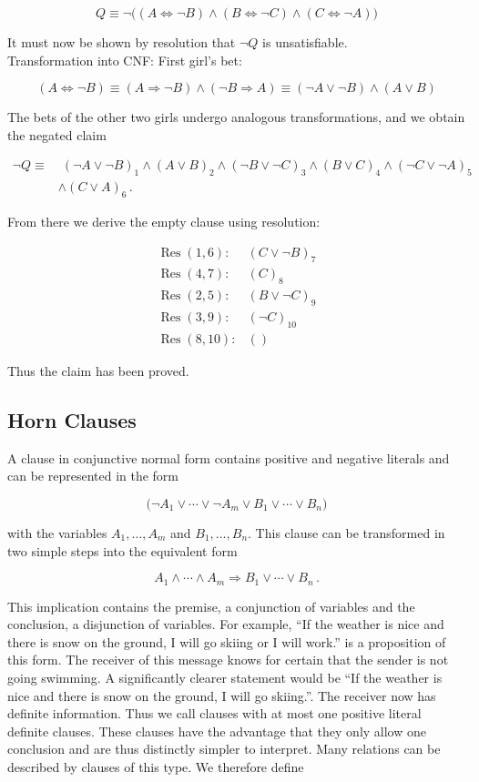 \documentclass[10pt]{book}
\begin{document}
$$
Q \equiv \neg\big((A \Leftrightarrow \neg B) \wedge (B \Leftrightarrow \neg C) \wedge (C \Leftrightarrow \neg A)\big)
$$

It must now be shown by resolution that $\neg Q$ is unsatisfiable.\\
Transformation into CNF: First girl's bet:

$$
(A \Leftrightarrow \neg B) \equiv (A \Rightarrow \neg B) \wedge (\neg B \Rightarrow A) \equiv (\neg A \vee \neg B) \wedge (A \vee B)
$$

The bets of the other two girls undergo analogous transformations, and we obtain the negated claim

$$
\begin{aligned}
\neg Q \equiv & \;(\neg A \vee \neg B)_{1} \wedge (A \vee B)_{2} \wedge (\neg B \vee \neg C)_{3} \wedge (B \vee C)_{4} \wedge (\neg C \vee \neg A)_{5} \\
& \wedge (C \vee A)_{6}\, .
\end{aligned}
$$

From there we derive the empty clause using resolution:

$$
\begin{array}{ll}
\operatorname{Res}(1,6): & (C \vee \neg B)_{7} \\
\operatorname{Res}(4,7): & (C)_{8} \\
\operatorname{Res}(2,5): & (B \vee \neg C)_{9} \\
\operatorname{Res}(3,9): & (\neg C)_{10} \\
\operatorname{Res}(8,10): & ()
\end{array}
$$

Thus the claim has been proved.

\subsection{Horn Clauses}
A clause in conjunctive normal form contains positive and negative literals and can be represented in the form

$$
\bigl(\neg A_{1} \vee \cdots \vee \neg A_{m} \vee B_{1} \vee \cdots \vee B_{n}\bigr)
$$

with the variables $A_{1}, \ldots, A_{m}$ and $B_{1}, \ldots, B_{n}$. This clause can be transformed in two simple steps into the equivalent form

$$
A_{1} \wedge \cdots \wedge A_{m} \Rightarrow B_{1} \vee \cdots \vee B_{n}\, .
$$

This implication contains the premise, a conjunction of variables and the conclusion, a disjunction of variables. For example, ``If the weather is nice and there is snow on the ground, I will go skiing or I will work.'' is a proposition of this form. The receiver of this message knows for certain that the sender is not going swimming. A significantly clearer statement would be ``If the weather is nice and there is snow on the ground, I will go skiing.''. The receiver now has definite information. Thus we call clauses with at most one positive literal definite clauses. These clauses have the advantage that they only allow one conclusion and are thus distinctly simpler to interpret. Many relations can be described by clauses of this type. We therefore define
\end{document}
